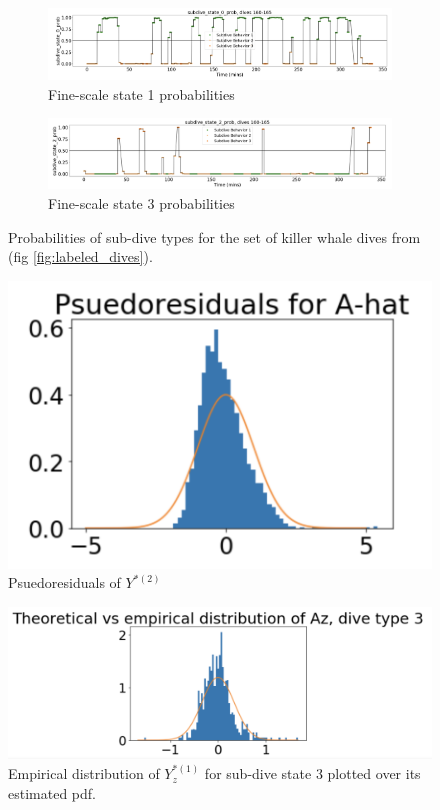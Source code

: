 \begin{figure}[ht]
	\centering
	\begin{subfigure}[t]{1.0\textwidth}
        \centering
        \includegraphics[width=5in]{../Plots/Fine_state_probs_1.png}
        \caption{Fine-scale state 1 probabilities}
    \end{subfigure}
    \newline
    \begin{subfigure}[t]{1.0\textwidth}
        \centering
        \includegraphics[width=5in]{../Plots/Fine_state_probs_3.png}
        \caption{Fine-scale state 3 probabilities}
    \end{subfigure}
	\caption{Probabilities of sub-dive types for the set of killer whale dives from (fig \ref{fig:labeled_dives}).}
	\label{fig:fine_probs}
\end{figure}

\begin{figure}[ht]
	\centering
	\includegraphics[width=5in]{../Plots/pseudoresids.png}
	\caption{Psuedoresiduals of $Y^{*(2)}$}
	\label{fig:pseudoresids}
\end{figure}

\begin{figure}[ht]
	\centering
	\includegraphics[width=5in]{../Plots/empirical_dist.png}
	\caption{Empirical distribution of $Y^{*(1)}_z$ for sub-dive state 3 plotted over its estimated pdf.}
	\label{fig:empirical_dist}
\end{figure}